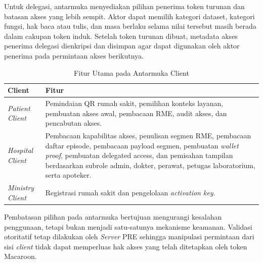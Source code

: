 Untuk delegasi, antarmuka menyediakan pilihan penerima token turunan dan batasan akses yang lebih sempit. Aktor dapat memilih kategori dataset, kategori fungsi, hak baca atau tulis, dan masa berlaku selama nilai tersebut masih berada dalam cakupan token induk. Setelah token turunan dibuat, metadata akses penerima delegasi dienkripsi dan disimpan agar dapat digunakan oleh aktor penerima pada permintaan akses berikutnya.

\begin{table}[!ht]
	\centering
	\caption{Fitur Utama pada Antarmuka Client}
	\label{tab:fitur-antarmuka-client}
	\small
	\begin{tabular}{|p{}|p{}|}
		\hline
		\textbf{Client}          & \textbf{Fitur}                                                                                                                                                                                                                                                               \\ \hline
		\textit{Patient Client}  & Pemindaian QR rumah sakit, pemilihan konteks layanan, pembuatan akses awal, pembacaan RME, audit akses, dan pencabutan akses.                                                                                                                                                \\ \hline
		\textit{Hospital Client} & Pembacaan kapabilitas akses, penulisan segmen RME, pembacaan daftar episode, pembacaan payload segmen, pembuatan \textit{wallet proof}, pembuatan delegated access, dan pemisahan tampilan berdasarkan subrole admin, dokter, perawat, petugas laboratorium, serta apoteker. \\ \hline
		\textit{Ministry Client} & Registrasi rumah sakit dan pengelolaan \textit{activation key}.                                                                                                                                                                                                              \\ \hline
	\end{tabular}
\end{table}

Pembatasan pilihan pada antarmuka bertujuan mengurangi kesalahan penggunaan, tetapi bukan menjadi satu-satunya mekanisme keamanan. Validasi otoritatif tetap dilakukan oleh \textit{Server} PRE sehingga manipulasi permintaan dari sisi \textit{client} tidak dapat memperluas hak akses yang telah ditetapkan oleh token Macaroon.
